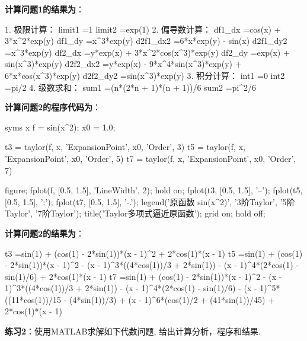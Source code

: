 \documentclass[zihao=-4]{ctexart}
\begin{document}
\textbf{计算问题1的结果为}：
\begin{mcode}
1. 极限计算：
 limit1 =1
 limit2 =exp(1)
2. 偏导数计算：
 df1_dx =cos(x) + 3*x^2*exp(y)
 df1_dy =x^3*exp(y)
 d2f1_dx2 =6*x*exp(y) - sin(x)
 d2f1_dy2 =x^3*exp(y)
 df2_dx =y*exp(x) + 3*x^2*cos(x^3)*exp(y)
 df2_dy =exp(x) + sin(x^3)*exp(y)
 d2f2_dx2 =y*exp(x) - 9*x^4*sin(x^3)*exp(y) + 6*x*cos(x^3)*exp(y)
 d2f2_dy2 =sin(x^3)*exp(y)
3. 积分计算：
 int1 =0
 int2 =pi/2
4. 级数求和：
 sum1 =(n*(2*n + 1)*(n + 1))/6
 sum2 =pi^2/6
\end{mcode}


\textbf{计算问题2的程序代码为}：
\begin{mcode}
syms x
f = sin(x^2);
x0 = 1.0;

t3 = taylor(f, x, 'ExpansionPoint', x0, 'Order', 3)
t5 = taylor(f, x, 'ExpansionPoint', x0, 'Order', 5)
t7 = taylor(f, x, 'ExpansionPoint', x0, 'Order', 7)

figure;
fplot(f, [0.5, 1.5], 'LineWidth', 2);
hold on;
fplot(t3, [0.5, 1.5], '--');
fplot(t5, [0.5, 1.5], ':');
fplot(t7, [0.5, 1.5], '-.');
legend('原函数 sin(x^2)', '3阶Taylor', '5阶Taylor', '7阶Taylor');
title('Taylor多项式逼近原函数');
grid on;
hold off;
\end{mcode}


\textbf{计算问题2的结果为}：
\begin{mcode}
t3 =sin(1) + (cos(1) - 2*sin(1))*(x - 1)^2 + 2*cos(1)*(x - 1)
t5 =sin(1) + (cos(1) - 2*sin(1))*(x - 1)^2 - (x - 1)^3*((4*cos(1))/3 + 2*sin(1)) - (x - 1)^4*(2*cos(1) - sin(1)/6) + 2*cos(1)*(x - 1)
t7 =sin(1) + (cos(1) - 2*sin(1))*(x - 1)^2 - (x - 1)^3*((4*cos(1))/3 + 2*sin(1)) - (x - 1)^4*(2*cos(1) - sin(1)/6) - (x - 1)^5*((11*cos(1))/15 - (4*sin(1))/3) + (x - 1)^6*(cos(1)/2 + (41*sin(1))/45) + 2*cos(1)*(x - 1)
\end{mcode}



\noindent
\textbf{练习2}：使用MATLAB求解如下代数问题, 给出计算分析，程序和结果.
\end{document}
